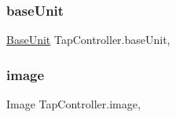 \subsubsection{\texorpdfstring{baseUnit}{baseUnit}}
{\footnotesize\ttfamily \mbox{\hyperlink{class_base_unit}{Base\+Unit}} Tap\+Controller.\+base\+Unit\hspace{0.3cm}{\ttfamily [get]}, {\ttfamily [set]}}

\mbox{\label{class_tap_controller_a0da9433117902759e995719f5ef952aa}} 
\subsubsection{\texorpdfstring{image}{image}}
{\footnotesize\ttfamily Image Tap\+Controller.\+image\hspace{0.3cm}{\ttfamily [get]}, {\ttfamily [set]}}

